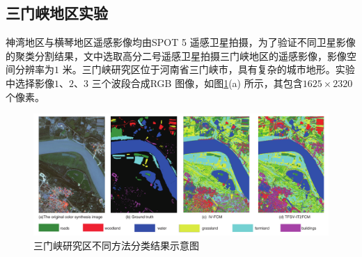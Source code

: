 \subsection{三门峡地区实验}
\label{subsec::chap03-4-1}
神湾地区与横琴地区遥感影像均由SPOT 5 遥感卫星拍摄，为了验证不同卫星影像的聚类分割结果，文中选取高分二号遥感卫星拍摄三门峡地区的遥感影像，影像空间分辨率为$1$ 米。三门峡研究区位于河南省三门峡市，具有复杂的城市地形。实验中选择影像$1$、$2$、$3$ 三个波段合成RGB 图像，如图\ref{fig:sanmenxia}(a) 所示，其包含$1625 \times 2320$ 个像素。

\begin{figure}[htb]
    \centering
    \includegraphics[width=1.0\textwidth]{figures/sanmenxia}
    \caption{三门峡研究区不同方法分类结果示意图 }\label{fig:sanmenxia}
\end{figure}


